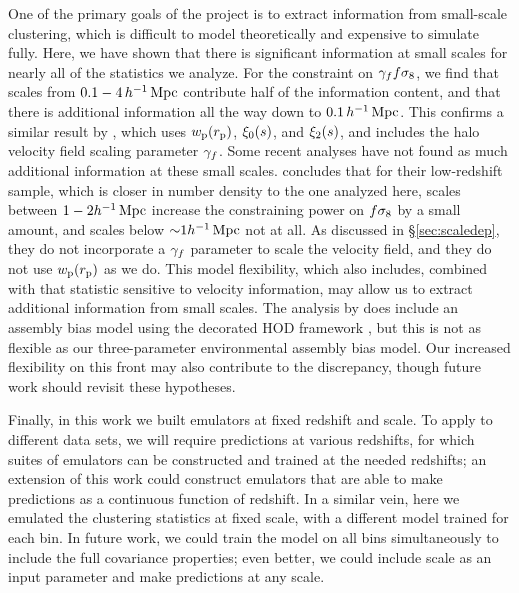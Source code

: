 One of the primary goals of the \aemulus project is to extract information from small-scale clustering, which is difficult to model theoretically and expensive to simulate fully.
Here, we have shown that there is significant information at small scales for nearly all of the statistics we analyze.
For the constraint on $\gamma_f f\sigma_8$, we find that scales from $0.1 - 4 \, h^{-1}\,\mathrm{Mpc}$ contribute half of the information content, and that there is additional information all the way down to $0.1 \, h^{-1}\,\mathrm{Mpc}$.
This confirms a similar result by \cite{Zhai2019}, which uses $w_\mathrm{p}(r_\mathrm{p})$, $\xi_0(s)$, and $\xi_2(s)$, and includes the halo velocity field scaling parameter $\gamma_f$. 
Some recent analyses have not found as much additional information at these small scales.
\cite{Lange2022} concludes that for their low-redshift sample, which is closer in number density to the one analyzed here, scales between $1-2 h^{-1}\,\mathrm{Mpc}$ increase the constraining power on $f\sigma_8 $ by a small amount, and scales below $\mathord{\sim}1 h^{-1}\,\mathrm{Mpc}$ not at all.
As discussed in \S\ref{sec:scaledep}, they do not incorporate a $\gamma_f$ parameter to scale the velocity field, and they do not use $w_\mathrm{p}(r_\mathrm{p})$ as we do.
This model flexibility, which \cite{Zhai2019} also includes, combined with that statistic sensitive to velocity information, may allow us to extract additional information from small scales.
The analysis by \cite{Lange2022} does include an assembly bias model using the decorated HOD framework \cite{Hearin2016}, but this is not as flexible as our three-parameter environmental assembly bias model.
Our increased flexibility on this front may also contribute to the discrepancy, though future work should revisit these hypotheses.

Finally, in this work we built emulators at fixed redshift and scale.
To apply to different data sets, we will require predictions at various redshifts, for which suites of emulators can be constructed and trained at the needed redshifts; an extension of this work could construct emulators that are able to make predictions as a continuous function of redshift.
In a similar vein, here we emulated the clustering statistics at fixed scale, with a different model trained for each bin. 
In future work, we could train the model on all bins simultaneously to include the full covariance properties; even better, we could include scale as an input parameter and make predictions at any scale.


\section*{}
 
